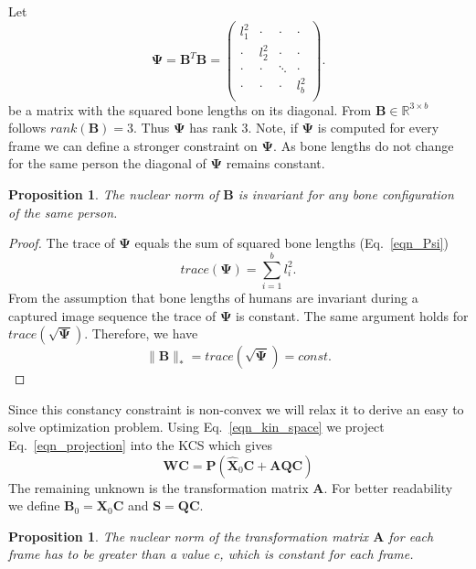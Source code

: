\documentclass[10pt,letterpaper]{article}
\newtheorem{proposition}[theorem]{Proposition}
\begin{document}
Let 
\begin{equation}
\label{eqn_Psi}
\bm{\Psi}=\bm{B}^T\bm{B}=
\begin{pmatrix}
l_1^2 & \cdot & \cdot & \cdot \\
\cdot & l_2^2 & \cdot & \cdot \\
\cdot & \cdot & \ddots & \cdot \\
\cdot & \cdot & \cdot & l_b^2 \\
\end{pmatrix}
.
\end{equation}
be a matrix with the squared bone lengths on its diagonal. From $\bm{B}\in\mathbb{R}^{3\times b}$ follows $rank(\bm{B})=3$. Thus $\bm{\Psi}$ has rank $3$. Note, if $\bm{\Psi}$ is computed for every frame we can define a stronger constraint on $\bm{\Psi}$. As bone lengths do not change for the same person the diagonal of $\bm{\Psi}$ remains constant.
\begin{proposition}
	\label{prop_bone_lengths}
	The nuclear norm of $\bm{B}$ is invariant for any bone configuration of the same person.
\end{proposition}

\begin{proof}
	The trace of $\bm{\Psi}$ equals the sum of squared bone lengths (Eq.~\eqref{eqn_Psi})
	\begin{equation}
	trace(\bm{\Psi})=\sum_{i=1}^b l_i^2
	.
	\end{equation}
	From the assumption that bone lengths of humans are invariant during a captured image sequence the trace of $\bm{\Psi}$ is constant. The same argument holds for $trace(\sqrt{\bm{\Psi}})$. Therefore, we have
	\begin{equation}
	\|\bm{B}\|_*=trace(\sqrt{\bm{\Psi}})=const
	.
	\end{equation}
\end{proof}
Since this constancy constraint is non-convex we will relax it to derive an easy to solve optimization problem. Using Eq.~\eqref{eqn_kin_space} we project Eq.~\eqref{eqn_projection} into the KCS which gives
\begin{equation}
	\bm{W} \bm{C}=\bm{P} (\hat{\bm{X}}_0 \bm{C} + \bm{A}\bm{Q} \bm{C})
\end{equation}
The remaining unknown is the transformation matrix $\bm{A}$. For better readability we define $\bm{B}_0=\bm{X}_0 \bm{C}$ and $\bm{S}=\bm{Q} \bm{C}$.

\begin{proposition}
	\label{prop_nn}
	The nuclear norm of the transformation matrix $\bm{A}$ for each frame has to be greater than a value $c$, which is constant for each frame.
\end{proposition}
\end{document}
